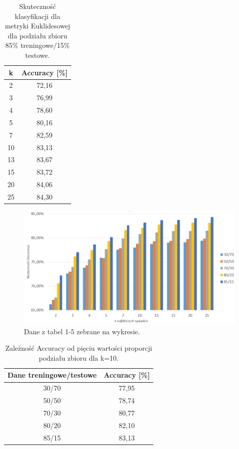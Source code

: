 \documentclass{classrep}
\begin{document}
\begin{table}[h!]
	\centering
	\begin{tabular} {c c}
		\hline
		\textbf{k} & \textbf{Accuracy [\%]} \\ [0.5ex] 
		\hline
		\hline 
		2 & 72,16 \\ 
		3 & 76,99 \\
		4 & 78,60 \\
		5 & 80,16 \\
		7 & 82,59 \\
		10 & 83,13  \\
		13 & 83,67 \\ 
		15 & 83,72 \\
		20 & 84,06 \\
		25 & 84,30 \\
		\hline
	\end{tabular}
	\caption{Skuteczność klasyfikacji dla metryki Euklidesowej dla podziału zbioru 85\% treningowe/15\% testowe. }
\end{table}

\begin{figure}[h!]
    \centering
    \includegraphics[width=1\textwidth]{testtren.png}
    \caption{Dane z tabel 1-5 zebrane na wykresie.}
    \label{testtren}
\end{figure}

\begin{table}[h!]
	\centering
	\begin{tabular} {c c}
		\hline
		\textbf{Dane treningowe/testowe} & \textbf{Accuracy [\%]} \\ [0.5ex] 
		\hline
		\hline 
		30/70 & 77,95 \\ 
		50/50 & 78,74 \\
		70/30 & 80,77 \\
		80/20 & 82,10 \\
		85/15 & 83,13 \\
		\hline
	\end{tabular}
	\caption{Zależność Accuracy od pięciu wartości proporcji podziału zbioru dla k=10. }
\end{table}
\end{document}
